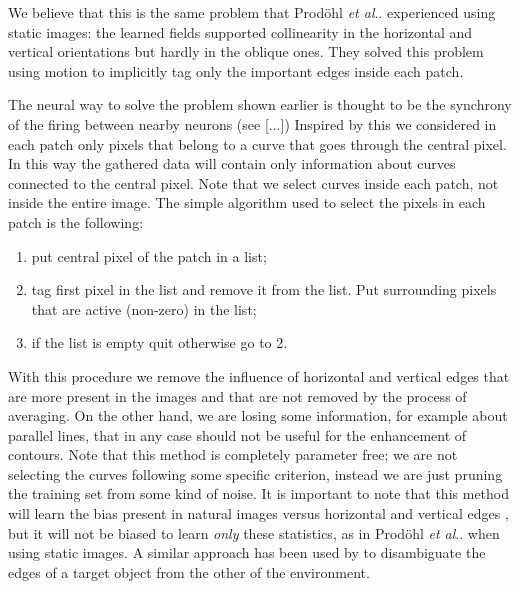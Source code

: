 \documentclass{llncs}
\makeatletter
\DeclareRobustCommand\onedot{\futurelet\@let@token\@onedot}
\def\@onedot{\ifx\@let@token.\else.\null\fi\xspace}
\def\etal{\emph{et al}\onedot}
\makeatother
\begin{document}


We believe that this is the same problem that Prod\"ohl \etal \cite{Prodohl01} experienced using static images: the learned fields supported collinearity in the horizontal and vertical orientations but hardly in the oblique ones. They solved this problem using motion to implicitly tag only the important edges inside each patch.

The neural way to solve the problem shown earlier is thought
to be the synchrony of the firing between nearby neurons (see [...])
Inspired by this we considered in each patch only pixels
that belong to a curve that goes through the central pixel. In this way the gathered data will contain only information about curves connected to the central pixel.
Note that we select curves inside each patch, not inside the entire image.
The simple algorithm used to select the pixels in each patch is the following:
\begin{enumerate}
	\item put central pixel of the patch in a list;
	\item tag first pixel in the list and remove it from the list. Put surrounding pixels that are active (non-zero) in the list;
	\item if the list is empty quit otherwise go to 2.
\end{enumerate}
With this procedure we remove the influence of horizontal and vertical edges that are more present in the images and
that are not removed by the process of averaging. On the other hand, we are losing some information, for example about parallel lines, that in any case should not be useful for the enhancement of contours.
Note that this method is completely parameter free; we are not selecting the curves following some specific criterion, instead we are just pruning the training set from some kind of noise.
It is important to note that this method will learn the bias present in natural images versus horizontal and vertical edges \cite{CoppolaPMP98}, but it will not be biased to learn \emph{only} these statistics, as in Prod\"ohl \etal \cite{Prodohl01} when using static images.
A similar approach has been used by \cite{Fitzpatrick03} to disambiguate the edges of a target object from the other of the environment.
\end{document}
